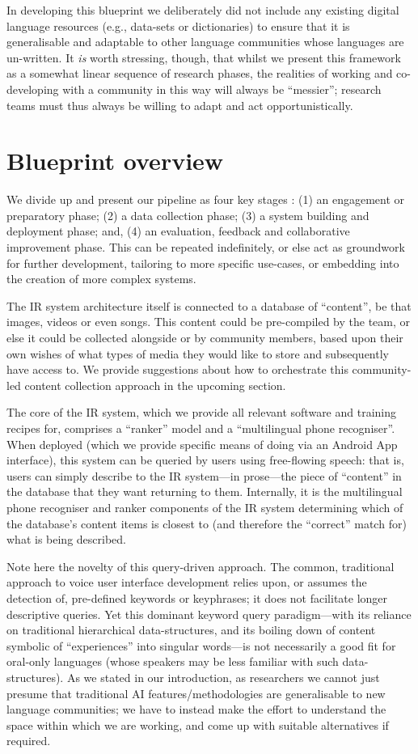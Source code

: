 \documentclass[10pt,twoside,openright]{report}
\begin{document}
In developing this blueprint we deliberately did not include any existing digital language resources (e.g., data-sets or dictionaries) to ensure that it is generalisable and adaptable to other language communities whose languages are un-written.
It \textit{is} worth stressing, though, that whilst we present this framework as a somewhat linear sequence of research phases, the realities of working and co-developing with a community in this way will always be ``messier''; research teams must thus always be willing to adapt and act opportunistically.


\section{Blueprint overview}
We divide up and present our pipeline as four key stages
: (1) an engagement or preparatory phase; (2) a data collection phase; (3) a system building and deployment phase; and, (4) an evaluation, feedback and collaborative improvement phase.
This can be repeated indefinitely, or else act as groundwork for further development, tailoring to more specific use-cases, or embedding into the creation of more complex systems. 

The IR system architecture itself is connected to a database of ``content'', be that images, videos or even songs.
This content could be pre-compiled by the team, or else it could be collected alongside or by community members, based upon their own wishes of what types of media they would like to store and subsequently have access to.
We provide suggestions about how to orchestrate this community-led content collection approach in the upcoming section.

The core of the IR system, which we provide all relevant software and training recipes for, comprises a ``ranker'' model and a ``multilingual phone recogniser''.
When deployed (which we provide specific means of doing via an Android App interface), this system can be queried by users using free-flowing speech: that is, users can simply describe to the IR system---in prose---the piece of ``content'' in the database that they want returning to them.
Internally, it is the multilingual phone recogniser and ranker components of the IR system determining which of the database's content items is closest to (and therefore the ``correct'' match for) what is being described. 

Note here the novelty of this query-driven approach.
The common, traditional approach to voice user interface development relies upon, or assumes the detection of, pre-defined keywords or keyphrases; it does not facilitate longer descriptive queries.
Yet this dominant keyword query paradigm---with its reliance on traditional hierarchical data-structures, and its boiling down of content symbolic of ``experiences'' into singular words---is not necessarily a good fit for oral-only languages (whose speakers may be less familiar with such data-structures).
As we stated in our introduction, as researchers we cannot just presume that traditional AI features/methodologies are generalisable to new language communities; we have to instead make the effort to understand the space within which we are working, and come up with suitable alternatives if required.
\end{document}
